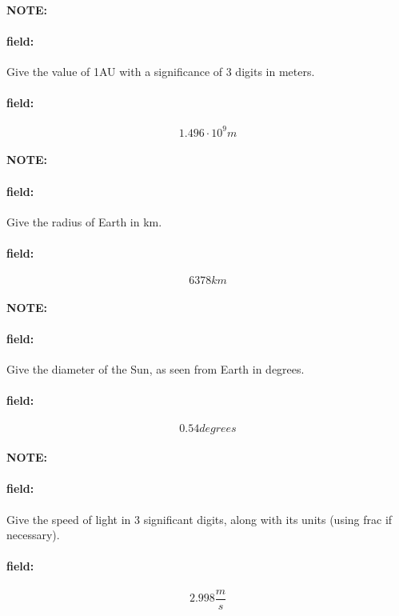 \documentclass[12pt]{article}
\newenvironment{note}{\paragraph{NOTE:}}{}
\newenvironment{field}{\paragraph{field:}}{}
\begin{document}
\begin{note}
   \begin{field}
       Give the value of 1AU with a significance of 3 digits in meters.
   \end{field}
   \begin{field}
		\[
			1.496\cdot10^9m
		\]
   \end{field}
\end{note}

\begin{note}
   \begin{field}
       Give the radius of Earth in km.
   \end{field}
   \begin{field}
		\[
			6378km
		\]
   \end{field}
\end{note}

\begin{note}
   \begin{field}
       Give the diameter of the Sun, as seen from Earth in degrees.
   \end{field}
   \begin{field}
		\[
			0.54 degrees
		\]
   \end{field}
\end{note}

\begin{note}
   \begin{field}
       Give the speed of light in 3 significant digits, along with its units (using frac if necessary).
   \end{field}
   \begin{field}
		\[
			2.998\frac{m}{s}
		\]
   \end{field}
\end{note}
\end{document}
